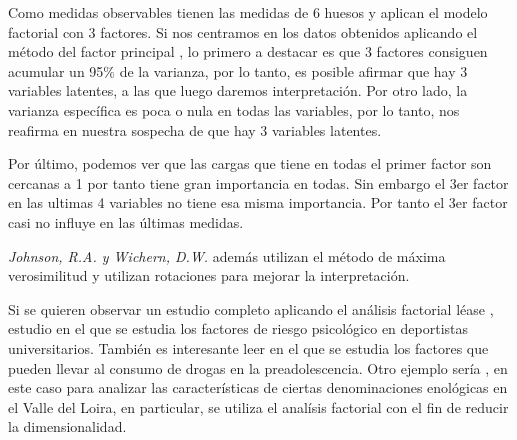 \noindent Como medidas observables tienen las medidas de 6 huesos y aplican el modelo factorial con 3 factores. Si nos centramos en los datos obtenidos aplicando el método del factor principal \cite{Peña 2002, Johnson 2007}, lo primero a destacar es que 3 factores consiguen acumular un 95\% de la varianza, por lo tanto, es posible afirmar que hay 3 variables latentes, a las que luego daremos interpretación. Por otro lado, la varianza específica es poca o nula en todas las variables, por lo tanto, nos reafirma en nuestra sospecha de que hay 3 variables latentes. 

\noindent Por último, podemos ver que las cargas que tiene en todas el primer factor son cercanas a 1 por tanto tiene gran importancia en todas. Sin embargo el 3er factor en las ultimas 4 variables no tiene esa misma importancia. Por tanto el 3er factor casi no influye en las últimas medidas. 

\noindent \emph{Johnson, R.A. y Wichern, D.W.}\cite{Johnson 2007} además utilizan el método de máxima verosimilitud y utilizan rotaciones para mejorar la interpretación.

\noindent Si se quieren observar un estudio completo aplicando el análisis factorial léase \cite{Galindo 2015}, estudio en el que se estudia los factores de riesgo psicológico en deportistas universitarios.  También es interesante leer \cite{Diez 2002} en el que se estudia los factores que pueden llevar al consumo de drogas en la preadolescencia. Otro ejemplo sería \cite{Pages 2005}, en este caso para analizar las características de ciertas denominaciones  enológicas en el Valle del Loira, en particular, se utiliza el analísis factorial con el fin de reducir la dimensionalidad. 

